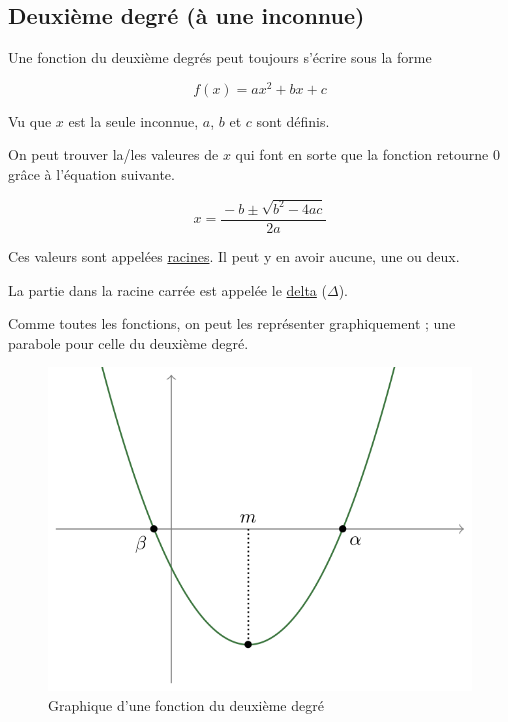\documentclass[a4paper]{article}
\begin{document}
    \subsection{Deuxième degré (à une inconnue)}
    Une fonction du deuxième degrés peut toujours s'écrire sous la forme
    
    \begin{equation}\label{eq:ddbase}
    f(x) = ax^2 + bx + c
    \end{equation}

    Vu que $x$ est la seule inconnue, $a$, $b$ et $c$ sont définis.

    On peut trouver la/les valeures de $x$ qui font en sorte que la fonction
    retourne $0$ grâce à l'équation suivante.

    \begin{equation}\label{eq:resdds}
        x = \frac{{}-b \pm \sqrt{b^2 -4ac}}{2a} 
    \end{equation}

    \noindent Ces valeurs sont appelées \underline{racines}. Il peut y en
    avoir aucune, une ou deux.

    La partie dans la racine carrée est appelée le \underline{delta} ($\Delta$). 

    Comme toutes les fonctions, on peut les représenter graphiquement ; une
    parabole pour celle du deuxième degré.
    \begin{figure}[H]
        \centering
        \includegraphics[scale=0.3]{parabole.png}
        \caption{Graphique d'une fonction du deuxième degré}
        \label{fig:parabole}
    \end{figure}
\end{document}
